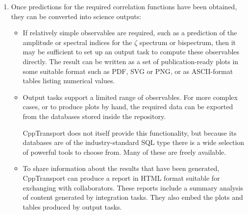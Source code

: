 \documentclass[11pt,a4paper]{article}
\newcommand{\packagefont}{\sffamily}
\newcommand{\CppTransport}{{\packagefont CppTransport}}
\begin{document}
\begin{enumerate}
    \item Once predictions for the required correlation functions have
    been obtained, they can be converted into science outputs:
    \begin{itemize}
        \item If relatively simple observables are required, such as
        a prediction of the amplitude or spectral indices for
        the $\zeta$ spectrum or bispectrum,
        then it may be sufficient to set up an output task
        to compute these observables directly.
        The result can be written as a set of
        publication-ready plots in
        some suitable format such as PDF, SVG or PNG,
        or as ASCII-format tables listing numerical values.
        
        \item Output tasks support a limited range of observables.
        For more complex cases, or to produce plots by hand,
        the required data can be exported from the databases stored inside
        the repository.
        
        {\CppTransport} does not itself provide this functionality,
        but because its databases are of the industry-standard SQL type
        there is a wide selection of powerful tools to choose from. Many
        of these are freely available.
        
        \item To share information about the results that have been generated,
        {\CppTransport} can produce a report in HTML format
        suitable for exchanging with collaborators.
        These reports include a summary analysis of content
        generated by integration tasks.
        They also
        embed the plots and tables produced by output tasks.
        
    \end{itemize}

\end{enumerate}
\end{document}

